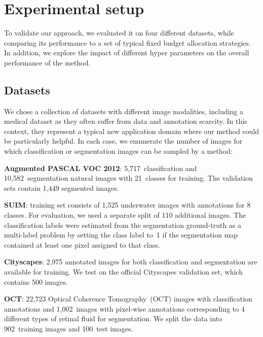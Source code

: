 \section{Experimental setup}
\label{sec:experiments_fullweak}

To validate our approach, we evaluated it on four different datasets, while comparing its performance to a set of typical fixed budget allocation strategies. In addition, we explore the impact of different hyper parameters on the overall performance of the method. 

\subsection{Datasets} 
We chose a collection of datasets with different image modalities, including a medical dataset as they often suffer from data and annotation scarcity. In this context, they represent a typical new application domain where our method could be particularly helpful. In each case, we enumerate the number of images for which classification or segmentation images can be sampled by a method:
\begin{description}
    \item \textbf{Augmented PASCAL VOC 2012}: 5,717~classification and 10,582~segmentation natural images with 21~classes for training. The validation sets contain 1,449 segmented images.
    \item \textbf{SUIM}: training set consists of 1,525 underwater images with annotations for 8 classes. For evaluation, we used a separate split of 110 additional images. The classification labels were estimated from the segmentation ground-truth as a multi-label problem by setting the class label to~1 if the segmentation map contained at least one pixel assigned to that class.
    \item \textbf{Cityscapes}: 2,975 annotated images for both classification and segmentation are available for training. We test on the official Cityscapes validation set, which contains 500 images. 
    \item \textbf{OCT}: 22,723 Optical Coherence Tomography~(OCT) images with classification annotations and 1,002~images with pixel-wise annotations corresponding to 4 different types of retinal fluid for segmentation. We split the data into 902~training images and 100~test images.
\end{description}

